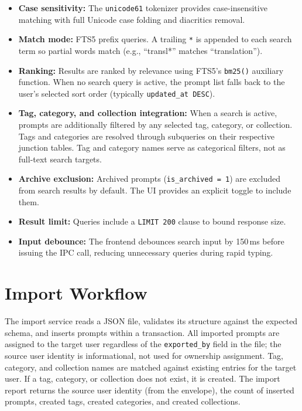 \documentclass[a4paper, 11pt, oneside]{report}
\begin{document}
\begin{itemize}
  \item \textbf{Case sensitivity:} The \texttt{unicode61} tokenizer
        provides case-insensitive matching with full Unicode case folding
        and diacritics removal.
  \item \textbf{Match mode:} FTS5 prefix queries.  A trailing \texttt{*}
        is appended to each search term so partial words match (e.g.,
        ``transl*'' matches ``translation'').
  \item \textbf{Ranking:} Results are ranked by relevance using FTS5's
        \texttt{bm25()} auxiliary function.  When no search query is
        active, the prompt list falls back to the user's selected sort
        order (typically \texttt{updated\_at DESC}).
  \item \textbf{Tag, category, and collection integration:} When a search
        is active, prompts are additionally filtered by any selected tag,
        category, or collection.  Tags and categories are resolved through
        subqueries on their respective junction tables.  Tag and category
        names serve as categorical filters, not as full-text search
        targets.
  \item \textbf{Archive exclusion:} Archived prompts
        (\texttt{is\_archived~=~1}) are excluded from search results by
        default.  The UI provides an explicit toggle to include them.
  \item \textbf{Result limit:} Queries include a \texttt{LIMIT~200}
        clause to bound response size.
  \item \textbf{Input debounce:} The frontend debounces search input
        by 150\,ms before issuing the IPC call, reducing unnecessary
        queries during rapid typing.
\end{itemize}

\section{Import Workflow}
\label{sec:import-workflow}

The import service reads a JSON file, validates its structure against the
expected schema, and inserts prompts within a transaction.  All imported
prompts are assigned to the target user regardless of the
\texttt{exported\_by} field in the file; the source user identity is
informational, not used for ownership assignment.  Tag, category, and
collection names are matched against existing entries for the target
user.  If a tag, category, or collection does not exist, it is created.
The import report returns the source user identity (from the envelope),
the count of inserted prompts, created tags, created categories, and
created collections.
\end{document}
